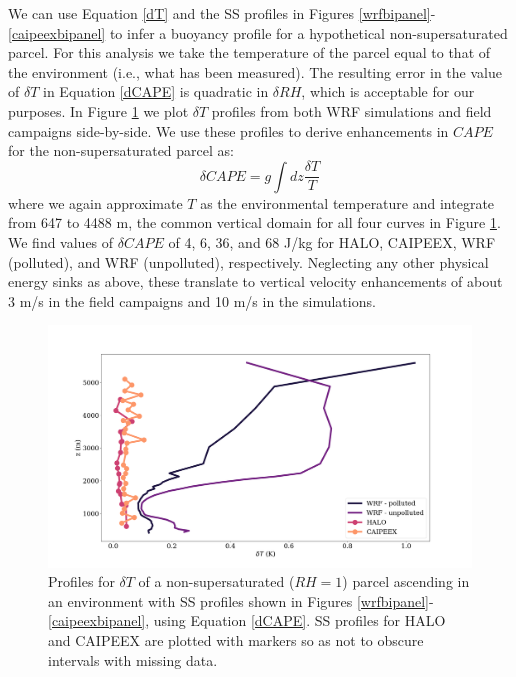 \documentclass{article}
\begin{document}
We can use Equation \ref{dT} and the SS profiles in Figures \ref{wrfbipanel}-\ref{caipeexbipanel} to infer a buoyancy profile for a hypothetical non-supersaturated parcel. For this analysis we take the temperature of the parcel equal to that of the environment (i.e., what has been measured). The resulting error in the value of $\delta T$ in Equation \ref{dCAPE} is quadratic in $\delta RH$, which is acceptable for our purposes. In Figure \ref{dTprofiles} we plot $\delta T$ profiles from both WRF simulations and field campaigns side-by-side. We use these profiles to derive enhancements in $CAPE$ for the non-supersaturated parcel as:
\begin{equation}
\label{dCAPE}
\delta CAPE = g \int dz \frac{\delta T}{T}
\end{equation}
where we again approximate $T$ as the environmental temperature and integrate from 647 to 4488 m, the common vertical domain for all four curves in Figure \ref{dTprofiles}. We find values of $\delta CAPE$ of 4, 6, 36, and 68 J/kg for HALO, CAIPEEX, WRF (polluted), and WRF (unpolluted), respectively. Neglecting any other physical energy sinks as above, these translate to vertical velocity enhancements of about 3 m/s in the field campaigns and 10 m/s in the simulations.

\begin{figure}[ht]
    \centering
    \includegraphics[width=12cm]{revmywrf/v1_FINAL_combined_dT_profile_figure.png}
    \caption{Profiles for $\delta T$ of a non-supersaturated ($RH=1$) parcel ascending in an environment with SS profiles shown in Figures \ref{wrfbipanel}-\ref{caipeexbipanel}, using Equation \ref{dCAPE}. SS profiles for HALO and CAIPEEX are plotted with markers so as not to obscure intervals with missing data.}
    \label{dTprofiles}
\end{figure}
\end{document}
